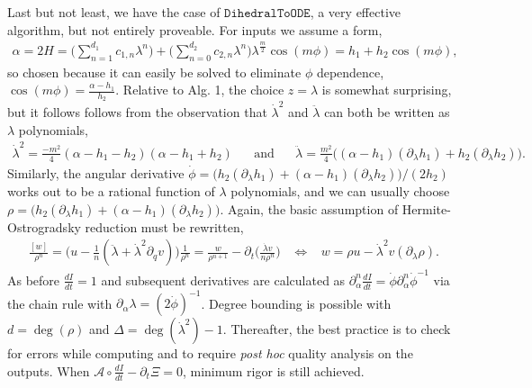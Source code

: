 \documentclass[nofootinbib,preprint]{revtex4-1}
\begin{document}
Last but not least, we have the case of $\texttt{DihedralToODE}$, a very effective 
algorithm, but not entirely proveable. For inputs we assume a form,
\begin{eqnarray}
\alpha=2H = \bigg(\sum_{n=1}^{d_1}c_{1,n}\lambda^{n}\bigg)
+\bigg(\sum_{n=0}^{d_2}c_{2,n}\lambda^{n}\bigg)\lambda^{\frac{m}{2}}\cos(m\phi)
= h_1+h_2\cos(m\phi),  \nonumber 
\end{eqnarray}
so chosen because it can easily be solved to eliminate $\phi$ dependence,
$\cos(m\phi)=\frac{\alpha-h_1}{h_2}$. Relative to Alg. 1, the choice 
$z=\lambda$ is somewhat surprising, but it follows follows from the observation
that $\dot{\lambda}^2$ and $\ddot{\lambda}$ can both be written as $\lambda$ 
polynomials, 
\begin{eqnarray}
\dot{\lambda}^2 = \frac{-m^2}{4}(\alpha-h_1-h_2)(\alpha-h_1+h_2) \nonumber
\;\;\;\;\;\; \text{and} \;\;\;\;\;\;
\ddot{\lambda} = \frac{m^2}{4}\big((\alpha-h_1)(\partial_{\lambda}h_1)+h_2(\partial_{\lambda}h_2)\big) \nonumber.
\end{eqnarray}
Similarly, the angular derivative  
$\dot{\phi}=\big(h_2(\partial_{\lambda}h_1)+(\alpha-h_1)(\partial_{\lambda}h_2)\big)/(2 h_2)$
works out to be a rational function of $\lambda$ polynomials, and we can usually choose 
$\rho=\big(h_2(\partial_{\lambda}h_1)+(\alpha-h_1)(\partial_{\lambda}h_2)\big)$. 
Again, the basic assumption of Hermite-Ostrogradsky reduction must be rewritten,
\begin{eqnarray}
\frac{[w]}{\rho^{n}}
=\Big(u-\frac{1}{n}(\ddot{\lambda}+\dot{\lambda}^2\partial_q v)\Big)\frac{1}{\rho^{n}} 
= \frac{w}{\rho^{n+1}}-\partial_t\bigg( \frac{\dot{\lambda}v}{n\rho^{n}}\bigg) 
\;\;\; \iff \;\;\; 
 w = \rho u -\dot{\lambda}^2 v (\partial_{\lambda}\rho) \nonumber.
\end{eqnarray}
As before $\frac{dI}{dt}=1$ and subsequent derivatives are calculated as 
$\partial_{\alpha}^n\frac{dI}{dt} = \dot{\phi}\partial_{\alpha}^n\dot{\phi}^{-1}$
via the chain rule with $\partial_{\alpha}\lambda = (2\dot{\phi})^{-1}$. Degree
bounding is possible with $d=\deg(\rho)$ and $\Delta=\deg(\dot{\lambda}^2)-1$. 
Thereafter, the best practice is to check for errors while computing and 
to require \textit{post hoc} quality analysis on the outputs. When 
$\mathcal{A}\circ\frac{dI}{dt}-\partial_t \Xi=0$, minimum rigor is still achieved.
\end{document}
